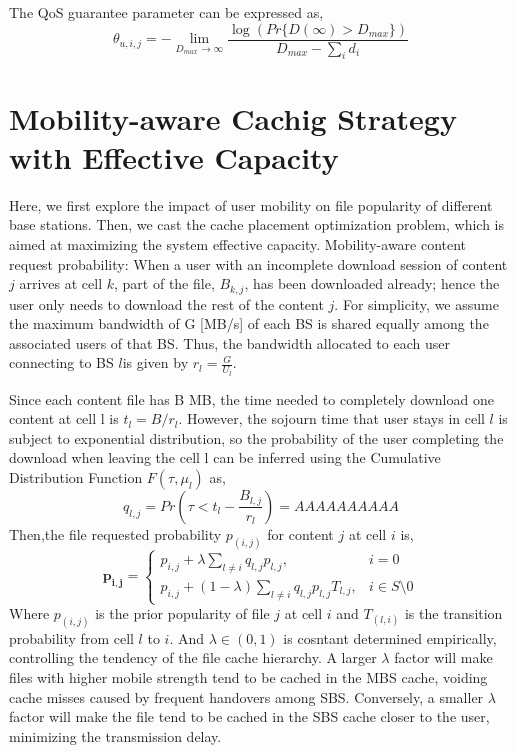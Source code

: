 \documentclass[conference]{IEEEtran}
\begin{document}
The QoS guarantee parameter can be expressed as,
\begin{equation}
\theta_{u,i,j}=-\lim_{D_{max}\to \infty}\frac{\log(Pr\{D(\infty)>D_{max}\})}{D_{max}-\sum_i d_i}
\end{equation}
\section{Mobility-aware Cachig Strategy with Effective Capacity}
Here, we first explore the impact of user mobility on file popularity of different base stations. Then, we cast the cache placement optimization problem, which is aimed at maximizing the system effective capacity.
Mobility-aware content request probability: When a user with an incomplete download session of content $j$ arrives at cell $k$, part of the file, $B_{k,j}$, has been downloaded already; hence the user only needs to download the rest of the content $j$. For simplicity, we assume the maximum bandwidth of G [MB/s] of each BS is shared equally among the associated users of that BS. Thus, the bandwidth allocated to each user connecting to BS $l$is given by $r_l=\frac{G}{U_l}$.

Since each content file has B MB, the time needed to completely download one content at cell l is $t_l=B/r_l$.
However, the sojourn time that user stays in cell $l$ is subject to exponential distribution, so the probability of the user completing the download when leaving the cell l can be inferred using the Cumulative Distribution Function $F(\tau,\mu_l)$ as,
\begin{equation}
q_{l,j}=Pr(\tau<t_l-\frac{B_{l,j}}{r_l})=AAAAAAAAAA
\end{equation}
Then,the file requested probability $p_(i,j)$ for content $j$ at cell $i$ is,
\begin{equation}
\mathbf{p_{i,j}}=
\begin{cases}
p_{i,j}+\lambda\sum_{l\neq i}q_{l,j}p_{l,j},  & i=0\\
p_{i,j}+(1-\lambda)\sum_{l\neq i}q_{l,j}p_{l,j}T_{l,j}, & i\in S\setminus 0
\end{cases}
\end{equation}
Where $p_(i,j)$ is the prior popularity of file $j$ at cell $i$ and $T_(l,i)$ is the transition probability from cell $l$ to $i$. And $\lambda\in(0,1)$ is cosntant determined empirically, controlling the tendency of the file cache hierarchy. A larger $\lambda$ factor will make files with higher mobile strength tend to be cached in the MBS cache, voiding cache misses caused by frequent handovers among SBS. Conversely, a smaller $\lambda$ factor will make the file tend to be cached in the SBS cache closer to the user, minimizing the transmission delay.
\end{document}

